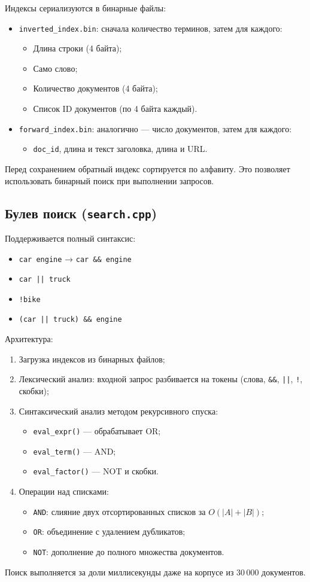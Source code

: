 Индексы сериализуются в бинарные файлы:
\begin{itemize}
\item \texttt{inverted\_index.bin}: сначала количество терминов, затем для каждого:
\begin{itemize}
\item Длина строки (4 байта);
\item Само слово;
\item Количество документов (4 байта);
\item Список ID документов (по 4 байта каждый).
\end{itemize}
\item \texttt{forward\_index.bin}: аналогично — число документов, затем для каждого:
\begin{itemize}
\item \texttt{doc\_id}, длина и текст заголовка, длина и URL.
\end{itemize}
\end{itemize}
Перед сохранением обратный индекс сортируется по алфавиту. Это позволяет использовать бинарный поиск при выполнении запросов.

\subsection*{Булев поиск (\texttt{search.cpp})}
Поддерживается полный синтаксис:
\begin{itemize}
\item \texttt{car engine} → \texttt{car \&\& engine}
\item \texttt{car || truck}
\item \texttt{!bike}
\item \texttt{(car || truck) \&\& engine}
\end{itemize}
Архитектура:
\begin{enumerate}
\item Загрузка индексов из бинарных файлов;
\item Лексический анализ: входной запрос разбивается на токены (слова, \texttt{&&}, \texttt{||}, \texttt{!}, скобки);
\item Синтаксический анализ методом рекурсивного спуска:
\begin{itemize}
\item \texttt{eval\_expr()} — обрабатывает OR;
\item \texttt{eval\_term()} — AND;
\item \texttt{eval\_factor()} — NOT и скобки.
\end{itemize}
\item Операции над списками:
\begin{itemize}
\item \texttt{AND}: слияние двух отсортированных списков за $O(|A|+|B|)$;
\item \texttt{OR}: объединение с удалением дубликатов;
\item \texttt{NOT}: дополнение до полного множества документов.
\end{itemize}
\end{enumerate}
Поиск выполняется за доли миллисекунды даже на корпусе из 30\,000 документов.

